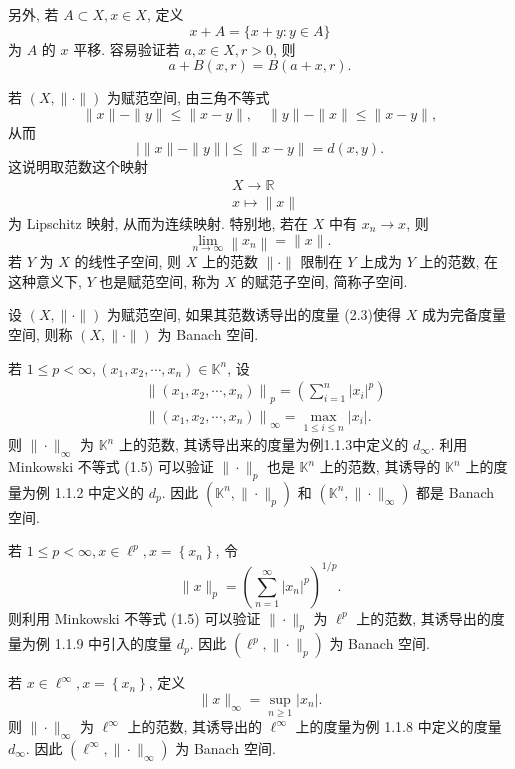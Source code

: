 \documentclass[openany]{ctexbook}
\theoremstyle{kaiti}
\theoremstyle{normal}
\begin{document}
另外, 若 $A \subset X, x \in X$, 定义
$$
x+A=\{x+y: y \in A\}
$$
为 $A$ 的 $x$ 平移. 容易验证若 $a, x \in X, r>0$, 则
$$
a+B(x, r)=B(a+x, r).
$$

若 $(X,\|\cdot\|)$ 为赋范空间, 由三角不等式
$$
\|x\|-\|y\| \leqslant\|x-y\|, \quad\|y\|-\|x\| \leqslant\|x-y\|,
$$
从而
$$
|\|x\|-\|y\|| \leqslant\|x-y\|=d(x, y).
$$
这说明取范数这个映射
$$
\begin{aligned}
&X \rightarrow \mathbb{R} \\
&x \mapsto\|x\|
\end{aligned}
$$
为 Lipschitz 映射, 从而为连续映射. 特别地, 若在 $X$ 中有 $x_n \rightarrow x$, 则
$$
\lim_{n \rightarrow \infty}\left\|x_n\right\|=\|x\|.
$$
若 $Y$ 为 $X$ 的线性子空间, 则 $X$ 上的范数 $\|\cdot\|$ 限制在 $Y$ 上成为 $Y$ 上的范数, 在这种意义下, $Y$ 也是赋范空间, 称为 $X$ 的赋范子空间, 简称子空间.

设 $(X, \|\cdot\|)$ 为赋范空间, 如果其范数诱导出的度量 (2.3)使得 $X$ 成为完备度量空间, 则称 $(X,\|\cdot\|)$ 为 Banach 空间.

若 $1 \leqslant p<\infty,\left(x_1, x_2, \cdots, x_n\right) \in \mathbb{K}^n$, 设
$$
\begin{aligned}
&\left\|\left(x_1, x_2, \cdots, x_n\right)\right\|_{p}=\left(\sum_{i=1}^n\left|x_{i}\right|^{p}\right) \\
&\left\|\left(x_1, x_2, \cdots, x_n\right)\right\|_{\infty}=\max_{1 \leqslant i \leqslant n}\left|x_{i}\right|.
\end{aligned}
$$
则 $\|\cdot\|_{\infty}$ 为 $\mathbb{K}^n$ 上的范数, 其诱导出来的度量为例1.1.3中定义的 $d_\infty$. 利用 Minkowski 不等式 (1.5) 可以验证 $\|\cdot\|_{p}$ 也是 $\mathbb{K}^n$ 上的范数, 其诱导的 $\mathbb{K}^n$ 上的度量为例 1.1.2 中定义的 $d_{p}$. 因此 $\left(\mathbb{K}^n,\|\cdot\|_{p}\right)$ 和 $\left(\mathbb{K}^n,\|\cdot\|_{\infty}\right)$ 都是 Banach 空间. 

若 $1 \leqslant p<\infty, x \in \ell^{p}, x=\left\{x_n\right\}$, 令
$$
\|x\|_{p}=\left(\sum_{n=1}^{\infty}\left|x_n\right|^{p}\right)^{1 / p}.
$$
则利用 Minkowski 不等式 (1.5) 可以验证 $\|\cdot\|_{p}$ 为 $\ell^{p}$ 上的范数, 其诱导出的度量为例 1.1.9 中引入的度量 $d_{p}$. 因此 $\left(\ell^{p},\|\cdot\|_{p}\right)$ 为 Banach 空间.

若 $x \in \ell^{\infty}, x=\left\{x_n\right\}$, 定义
$$
\|x\|_\infty=\sup_{n \geqslant 1}\left|x_n\right|.
$$
则 $\|\cdot\|_{\infty}$ 为 $\ell^{\infty}$ 上的范数, 其诱导出的 $\ell^{\infty}$ 上的度量为例 1.1.8 中定义的度量 $d_{\infty}$. 因此 $\left(\ell^{\infty},\|\cdot\|_{\infty}\right)$ 为 Banach 空间.
\end{document}
